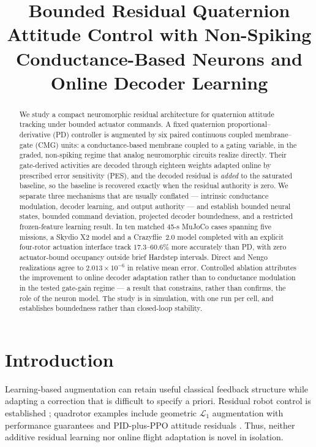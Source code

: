 \documentclass[letterpaper,10pt,conference]{IEEEtran}
\title{Bounded Residual Quaternion Attitude Control with Non-Spiking
Conductance-Based Neurons and Online Decoder Learning}
\author{%
\IEEEauthorblockN{Gandhi Contreras\IEEEauthorrefmark{1}, Steven Sandoval\IEEEauthorrefmark{1}, Luis Garcia\IEEEauthorrefmark{2}}%
\IEEEauthorblockA{\IEEEauthorrefmark{1}New Mexico State University (NMSU), Las Cruces, NM, USA}%
\IEEEauthorblockA{\IEEEauthorrefmark{2}U.S. Air Force, Los Alamos, NM, USA}%
}
\begin{document}
\maketitle
\thispagestyle{empty}
\pagestyle{empty}

\begin{abstract}
We study a compact neuromorphic residual architecture for quaternion attitude
tracking under bounded actuator commands. A fixed quaternion
proportional--derivative (PD) controller is augmented by six paired
continuous coupled membrane--gate (CMG) units: a conductance-based membrane
coupled to a gating variable, in the graded, non-spiking regime that analog
neuromorphic circuits realize directly. Their gate-derived activities are
decoded through eighteen weights adapted online by prescribed error
sensitivity (PES), and the decoded residual is \emph{added} to the saturated
baseline, so the baseline is recovered exactly when the residual authority is
zero. We separate three mechanisms that are usually conflated --- intrinsic
conductance modulation, decoder learning, and output authority --- and
establish bounded neural states, bounded command deviation, projected decoder
boundedness, and a restricted frozen-feature learning result. In ten matched
45-s MuJoCo cases spanning five missions, a Skydio X2 model and a
Crazyflie~2.0 model completed with an explicit four-rotor actuation interface
track $17.3$--$60.6\%$ more accurately than PD, with zero actuator-bound
occupancy outside brief Hardstep intervals. Direct and Nengo realizations
agree to $2.013\times10^{-6}$ in relative mean error. Controlled ablation
attributes the improvement to online decoder adaptation rather than to
conductance modulation in the tested gate-gain regime --- a result that
constrains, rather than confirms, the role of the neuron model. The study is
in simulation, with one run per cell, and establishes boundedness rather than
closed-loop stability.
\end{abstract}

\section{Introduction}
Learning-based augmentation can retain useful classical feedback structure
while adapting a correction that is difficult to specify a priori.
Residual robot control is established \cite{johannink2019}; quadrotor
examples include geometric $\mathcal L_1$ augmentation with performance
guarantees \cite{wu2025l1quad} and PID-plus-PPO attitude residuals
\cite{li2027hpappo}. Thus, neither additive residual learning nor online
flight adaptation is novel in isolation.
\end{document}
